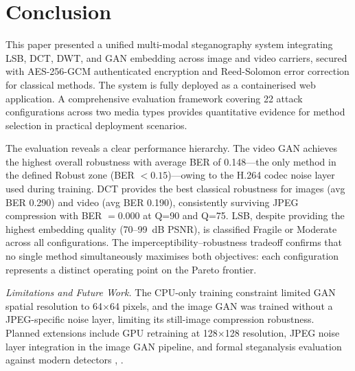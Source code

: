 \documentclass[conference]{IEEEtran}
\begin{document}
\section{Conclusion}

This paper presented a unified multi-modal steganography system
integrating LSB, DCT, DWT, and GAN embedding across image and
video carriers, secured with AES-256-GCM authenticated encryption and
Reed-Solomon error correction for classical methods. The system is
fully deployed as a containerised web application. A comprehensive
evaluation framework covering 22 attack configurations across two
media types provides quantitative evidence for method selection in
practical deployment scenarios.

The evaluation reveals a clear performance hierarchy. The video GAN
achieves the highest overall robustness with average BER of 0.148—the
only method in the defined Robust zone (BER $< 0.15$)—owing to the
H.264 codec noise layer used during training. DCT provides the best
classical robustness for images (avg BER 0.290) and video (avg BER
0.190), consistently surviving JPEG compression with BER $= 0.000$
at Q=90 and Q=75. LSB, despite providing the highest embedding quality
(70--99~dB PSNR), is classified Fragile or Moderate across all
configurations. The imperceptibility–robustness tradeoff confirms that
no single method simultaneously maximises both objectives: each
configuration represents a distinct operating point on the Pareto
frontier.

\textit{Limitations and Future Work.} The CPU-only training constraint
limited GAN spatial resolution to 64$\times$64 pixels, and the image
GAN was trained without a JPEG-specific noise layer, limiting its
still-image compression robustness. Planned extensions include GPU
retraining at 128$\times$128 resolution, JPEG noise layer integration
in the image GAN pipeline, and formal steganalysis evaluation
against modern detectors \cite{b6}, \cite{b12}.
\end{document}
